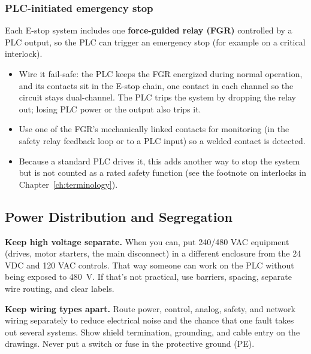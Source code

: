 \subsubsection*{PLC-initiated emergency stop}
Each E-stop system includes one \textbf{force-guided relay (FGR)} controlled by a PLC output, so the PLC can trigger an emergency stop (for example on a critical interlock).
\begin{itemize}[itemsep=2pt]
  \item Wire it fail-safe: the PLC keeps the FGR energized during normal operation, and its contacts sit in the E-stop chain, one contact in each channel so the circuit stays dual-channel. The PLC trips the system by dropping the relay out; losing PLC power or the output also trips it.
  \item Use one of the FGR's mechanically linked contacts for monitoring (in the safety relay feedback loop or to a PLC input) so a welded contact is detected.
  \item Because a standard PLC drives it, this adds another way to stop the system but is not counted as a rated safety function (see the footnote on interlocks in Chapter~\ref{ch:terminology}).
\end{itemize}

\subsection{Power Distribution and Segregation}
\textbf{Keep high voltage separate.} When you can, put 240/480 VAC equipment (drives, motor starters, the main disconnect) in a different enclosure from the 24 VDC and 120 VAC controls. That way someone can work on the PLC without being exposed to 480~V. If that's not practical, use barriers, spacing, separate wire routing, and clear labels.

\textbf{Keep wiring types apart.} Route power, control, analog, safety, and network wiring separately to reduce electrical noise and the chance that one fault takes out several systems. Show shield termination, grounding, and cable entry on the drawings. Never put a switch or fuse in the protective ground (PE).

